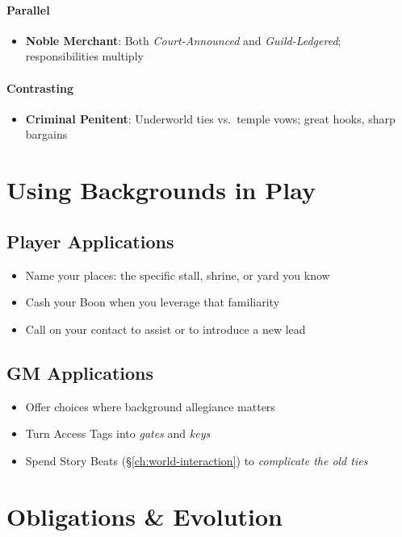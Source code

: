 \paragraph{Parallel}
\begin{itemize}
\item \textbf{Noble Merchant}: Both \textit{Court-Announced} and \textit{Guild-Ledgered}; responsibilities multiply
\end{itemize}

\paragraph{Contrasting}
\begin{itemize}
\item \textbf{Criminal Penitent}: Underworld ties vs.\ temple vows; great hooks, sharp bargains
\end{itemize}

\section{Using Backgrounds in Play}

\subsection*{Player Applications}
\begin{itemize}
\item Name your places: the specific stall, shrine, or yard you know
\item Cash your Boon when you leverage that familiarity
\item Call on your contact to assist or to introduce a new lead
\end{itemize}

\subsection*{GM Applications}
\begin{itemize}
\item Offer choices where background allegiance matters
\item Turn Access Tags into \emph{gates} and \emph{keys}
\item Spend Story Beats (\S\ref{ch:world-interaction}) to \emph{complicate the old ties}
\end{itemize}

\section{Obligations \& Evolution}
\label{sec:bg-obligation}

